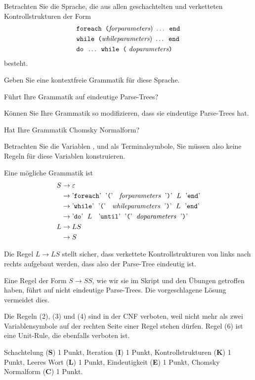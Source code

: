 Betrachten Sie die Sprache, die aus allen geschachtelten
und verketteten Kontrollstrukturen der Form
\begin{align*}
&\texttt{foreach (} \text{\em forparameters}\text{) } \dots \texttt{ end}
\\
&\texttt{while (} \text{\em whileparameters}\text{) } \dots \texttt{ end}
\\
&\texttt{do } \dots \texttt{ while (}\text{ \em doparameters\tt)}
\end{align*}
besteht.
\begin{teilaufgaben}
\item 
Geben Sie eine kontextfreie Grammatik für diese Sprache.
\item 
Führt Ihre Grammatik auf eindeutige Parse-Trees?
\item 
Können Sie Ihre Grammatik so modifizieren, dass sie eindeutige Parse-Trees hat.
\item 
Hat Ihre Grammatik Chomsky Normalform?
\end{teilaufgaben}

\begin{hinweis}
Betrachten Sie die Variablen
,
 und
als Terminalsymbole, Sie müssen also keine Regeln für diese Variablen
konstruieren.
\end{hinweis}


\begin{loesung}
\begin{teilaufgaben}
\item
Eine mögliche Grammatik ist
\begin{align}
S&\rightarrow \varepsilon
\\
 &\rightarrow
\text{'{\tt foreach}'\; '{\tt (}' \; {\em forparameters}\; '{\tt)}'\;
$L$
\;'{\tt end}'}
\\
 &\rightarrow
\text{'{\tt while}'\; '{\tt (}' \; {\em whileparameters}\; '{\tt)}'\;
$L$
\;'{\tt end}'}
\\
 &\rightarrow
\text{'{\tt do}'\;
$L$
\; '{\tt until}'\; '{\tt (}'\; {\em doparameters}\;
'{\tt)}'}
\\
L&\rightarrow LS
\\
 &\rightarrow S
\\
\end{align}
\item
Die Regel $L\to LS$ stellt sicher, dass verkettete Kontrollstrukturen
von links nach rechts aufgebaut werden, dass also der Parse-Tree eindeutig ist.
\item
Eine Regel der Form $S\to SS$, wie wir sie im Skript und den Übungen
getroffen haben, führt auf nicht eindeutige Parse-Trees.
Die vorgeschlagene Lösung vermeidet dies.
\item
Die Regeln (2), (3) und (4) sind in der CNF verboten,
weil nicht mehr als zwei Variablensymbole auf der rechten Seite einer Regel
stehen dürfen.
Regel (6) ist eine Unit-Rule, die ebenfalls verboten ist.
\qedhere
\end{teilaufgaben}
\end{loesung}

\begin{bewertung}
Schachtelung ({\bf S}) 1 Punkt,
Iteration ({\bf I}) 1 Punkt,
Kontrollstrukturen ({\bf K}) 1 Punkt,
Leeres Wort ({\bf L}) 1 Punkt,
Eindeutigkeit ({\bf E}) 1 Punkt,
Chomsky Normalform ({\bf C}) 1 Punkt.
\end{bewertung}


